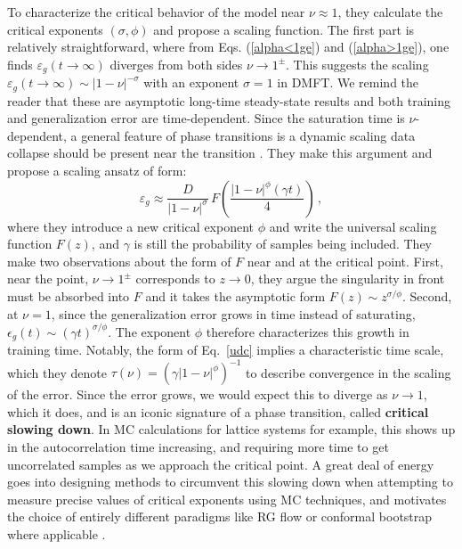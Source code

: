 \documentclass[11pt]{article}
\begin{document}
%
%
To characterize the critical behavior of the model near $\nu \approx 1$, they calculate the critical exponents $(\sigma,\phi)$ and propose a scaling function.  The first part is relatively straightforward, where from Eqs. (\ref{alpha<1ge}) and (\ref{alpha>1ge}), one finds
$\varepsilon_g(t\to\infty)$ diverges from both sides $\nu\to 1^{\pm}$.  This suggests the scaling $\varepsilon_g(t\to\infty)\sim |1-\nu|^{-\sigma}$ with an exponent $\sigma = 1$ in DMFT.  We remind the reader that these are asymptotic long-time steady-state results and both training and generalization error are time-dependent. Since the saturation time is $\nu$-dependent, a general feature of phase transitions is a dynamic scaling data collapse should be present near the transition \cite{goldenfeldLecturesPhaseTransitions2018a}.  They make this argument and propose a scaling ansatz of form:
\begin{equation}
\varepsilon_g
\approx \frac{D}{|1-\nu|^\sigma}\,
F\!\left(\frac{|1-\nu|^\phi (\gamma t)}{4}\right)\,,
\label{udc}
\end{equation}
where they introduce a new critical exponent $\phi$ and write the universal scaling function $F(z)$, and $\gamma$ is still the probability of samples being included. They make two observations about the form of $F$ near and at the critical point.  First, near the point, $\nu \to 1^{\pm}$ corresponds to $z\to 0$, they argue the singularity in front must be absorbed into $F$ and it takes the asymptotic form $F(z) \sim z^{\sigma/\phi}$.
Second, at $\nu = 1$, since the generalization error grows in time instead of saturating, $\epsilon_g (t) \sim (\gamma t ) ^{\sigma / \phi}$.  The exponent $\phi$ therefore characterizes this growth in training time.
Notably, the form of Eq.~\eqref{udc} implies a characteristic time scale, which they denote $\tau(\nu) = (\gamma |1-\nu|^\phi)^{-1}$ to describe convergence in the scaling of the error.  Since the error grows, we would expect this to diverge as $\nu \to 1$, which it does, and is an iconic signature of a phase transition, called \textbf{critical slowing down}.  In MC calculations for lattice systems for example, this shows up in the autocorrelation time increasing, and requiring more time to get uncorrelated samples as we approach the critical point. A great deal of energy goes into designing methods to circumvent this slowing down when attempting to measure precise values of critical exponents using MC techniques, and motivates the choice of entirely different paradigms like RG flow or conformal bootstrap where applicable \cite{goldenfeldLecturesPhaseTransitions2018a}. 
\end{document}
